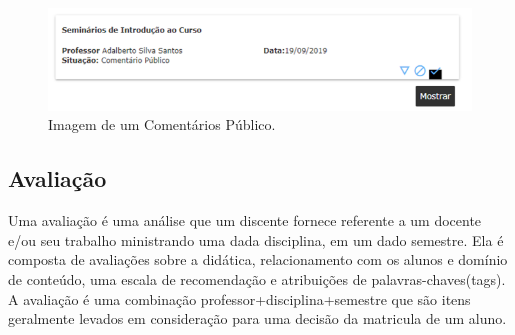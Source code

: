\documentclass[12pt, a4paper]{report}
\begin{document}
\begin{itemize}
\begin{figure}
\centering
\includegraphics[scale=0.7]{comentario_publico.png}
\caption{Imagem de um Comentários Público.}
\label{fig:comentario_publico}
\end{figure}

\end{itemize}
\subsection{Avaliação}

Uma avaliação é uma análise que um discente fornece referente a um docente e/ou seu trabalho ministrando uma dada disciplina, em um dado semestre. Ela é composta de avaliações sobre a didática, relacionamento com os alunos e domínio de conteúdo, uma escala de recomendação e atribuições de palavras-chaves(tags). A avaliação é uma combinação professor+disciplina+semestre que são itens geralmente levados em consideração para uma decisão da matricula de um aluno.
\end{document}
